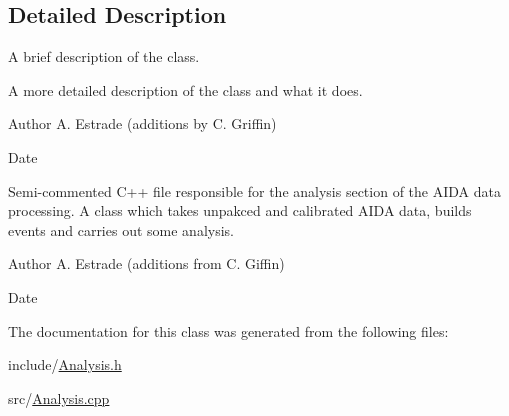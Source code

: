 \subsection{Detailed Description}
A brief description of the class. 

A more detailed description of the class and what it does.

\begin{DoxyAuthor}{Author}
A. Estrade (additions by C. Griffin) 
\end{DoxyAuthor}
\begin{DoxyDate}{Date}

\end{DoxyDate}
Semi-\/commented C++ file responsible for the analysis section of the A\-I\-D\-A data processing. A class which takes unpakced and calibrated A\-I\-D\-A data, builds events and carries out some analysis.

\begin{DoxyAuthor}{Author}
A. Estrade (additions from C. Giffin) 
\end{DoxyAuthor}
\begin{DoxyDate}{Date}

\end{DoxyDate}


The documentation for this class was generated from the following files\-:\begin{DoxyCompactItemize}
\item 
include/\hyperlink{Analysis_8h}{Analysis.\-h}\item 
src/\hyperlink{Analysis_8cpp}{Analysis.\-cpp}\end{DoxyCompactItemize}

